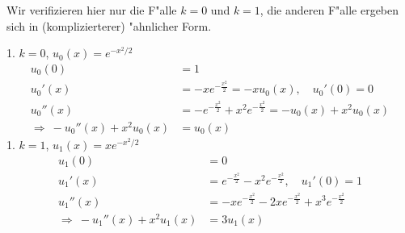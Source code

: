 \documentclass[11pt,answers]{exam}
\begin{document}
\begin{questions}
\begin{parts}
\end{parts}
\begin{solution}Wir verifizieren hier nur die F"alle $k=0$ und $k=1$, 
die anderen F"alle ergeben sich in (komplizierterer) "ahnlicher Form.

1. $k=0$, $u_0(x)=e^{-x^2/2}$
\begin{align*}
u_0(0)&=1
\\
u_0'(x)&=-xe^{-\frac{x^2}{2}}=-xu_0(x),\quad u_0'(0)=0
\\
u_0''(x)&=-e^{-\frac{x^2}{2}}+x^2e^{-\frac{x^2}{2}}=-u_0(x)+x^2u_0(x)
\\
\Rightarrow\ -u_0''(x)+x^2u_0(x)&=u_0(x)
\end{align*}
1. $k=1$, $u_1(x)=xe^{-x^2/2}$
\begin{align*}
u_1(0)&=0
\\
u_1'(x)&=e^{-\frac{x^2}{2}}-x^2e^{-\frac{x^2}{2}},\quad u_1'(0)=1
\\
u_1''(x)&=-xe^{-\frac{x^2}{2}}-2xe^{-\frac{x^2}{2}}+x^3e^{-\frac{x^2}{2}}
\\
\Rightarrow\ -u_1''(x)+x^2u_1(x)&=3u_1(x)
\end{align*}
\end{solution}



\begin{parts}


\end{parts}
\end{questions}
\end{document}

